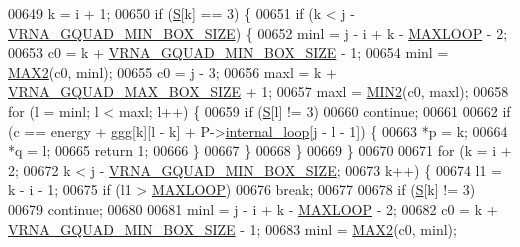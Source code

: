 \begin{DoxyCode}
00649   k = i + 1;
00650   \textcolor{keywordflow}{if} (\mbox{\hyperlink{group__energy__parameters__rw_gga7bf2bb363bcf5ce50d60255d256e5682af1ce01387d2348f8b858721a7db81670}{S}}[k] == 3) \{
00651     \textcolor{keywordflow}{if} (k < j - \mbox{\hyperlink{group__energy__parameters_gad7bdd880afca461f97763d79ee57a347}{VRNA\_GQUAD\_MIN\_BOX\_SIZE}}) \{
00652       minl  = j - i + k - \mbox{\hyperlink{energy__const_8h_ad1bd6eabac419670ddd3c9ed82145988}{MAXLOOP}} - 2;
00653       c0    = k + \mbox{\hyperlink{group__energy__parameters_gad7bdd880afca461f97763d79ee57a347}{VRNA\_GQUAD\_MIN\_BOX\_SIZE}} - 1;
00654       minl  = \mbox{\hyperlink{group__utils_ga33297b3679c713b0c4d897cd0fe3b122}{MAX2}}(c0, minl);
00655       c0    = j - 3;
00656       maxl  = k + \mbox{\hyperlink{group__energy__parameters_ga56cafabad2f8a7db83f2d5d3b0e8d313}{VRNA\_GQUAD\_MAX\_BOX\_SIZE}} + 1;
00657       maxl  = \mbox{\hyperlink{group__utils_gae0b9cd0ce090bd69b951aa73e8fa4f7d}{MIN2}}(c0, maxl);
00658       \textcolor{keywordflow}{for} (l = minl; l < maxl; l++) \{
00659         \textcolor{keywordflow}{if} (\mbox{\hyperlink{group__energy__parameters__rw_gga7bf2bb363bcf5ce50d60255d256e5682af1ce01387d2348f8b858721a7db81670}{S}}[l] != 3)
00660           \textcolor{keywordflow}{continue};
00661 
00662         \textcolor{keywordflow}{if} (c == energy + ggg[k][l - k] + P->\mbox{\hyperlink{group__energy__parameters_a2a4fb2c65023ec371c9b96573da6d2fc}{internal\_loop}}[j - l - 1]) \{
00663           *p  = k;
00664           *q  = l;
00665           \textcolor{keywordflow}{return} 1;
00666         \}
00667       \}
00668     \}
00669   \}
00670 
00671   \textcolor{keywordflow}{for} (k = i + 2;
00672        k < j - \mbox{\hyperlink{group__energy__parameters_gad7bdd880afca461f97763d79ee57a347}{VRNA\_GQUAD\_MIN\_BOX\_SIZE}};
00673        k++) \{
00674     l1 = k - i - 1;
00675     \textcolor{keywordflow}{if} (l1 > \mbox{\hyperlink{energy__const_8h_ad1bd6eabac419670ddd3c9ed82145988}{MAXLOOP}})
00676       \textcolor{keywordflow}{break};
00677 
00678     \textcolor{keywordflow}{if} (\mbox{\hyperlink{group__energy__parameters__rw_gga7bf2bb363bcf5ce50d60255d256e5682af1ce01387d2348f8b858721a7db81670}{S}}[k] != 3)
00679       \textcolor{keywordflow}{continue};
00680 
00681     minl  = j - i + k - \mbox{\hyperlink{energy__const_8h_ad1bd6eabac419670ddd3c9ed82145988}{MAXLOOP}} - 2;
00682     c0    = k + \mbox{\hyperlink{group__energy__parameters_gad7bdd880afca461f97763d79ee57a347}{VRNA\_GQUAD\_MIN\_BOX\_SIZE}} - 1;
00683     minl  = \mbox{\hyperlink{group__utils_ga33297b3679c713b0c4d897cd0fe3b122}{MAX2}}(c0, minl);

\end{DoxyCode}
